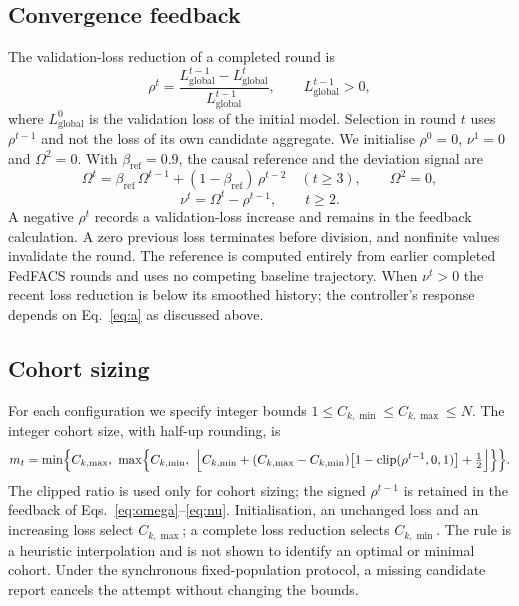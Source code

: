 \documentclass[pdflatex,sn-basic]{sn-jnl}
\begin{document}
\subsection{Convergence feedback}\label{sec4.5}
The validation-loss reduction of a completed round is
\begin{equation}\label{eq:rho}
\rho^t=\frac{L_{\mathrm{global}}^{t-1}-L_{\mathrm{global}}^{t}}{L_{\mathrm{global}}^{t-1}},\qquad L_{\mathrm{global}}^{t-1}>0,
\end{equation}
where $L_{\mathrm{global}}^0$ is the validation loss of the initial model. Selection in round $t$ uses $\rho^{t-1}$ and not the loss of its own candidate aggregate. We initialise $\rho^0=0$, $\nu^1=0$ and $\Omega^2=0$. With $\beta_{\mathrm{ref}}=0.9$, the causal reference and the deviation signal are
\begin{equation}\label{eq:omega}
\Omega^t=\beta_{\mathrm{ref}}\,\Omega^{t-1}+(1-\beta_{\mathrm{ref}})\,\rho^{t-2}\quad(t\ge 3),\qquad \Omega^2=0,
\end{equation}
\begin{equation}\label{eq:nu}
\nu^t=\Omega^t-\rho^{t-1},\qquad t\ge 2 .
\end{equation}
A negative $\rho^t$ records a validation-loss increase and remains in the feedback calculation. A zero previous loss terminates before division, and nonfinite values invalidate the round. The reference is computed entirely from earlier completed FedFACS rounds and uses no competing baseline trajectory. When $\nu^t>0$ the recent loss reduction is below its smoothed history; the controller's response depends on Eq.~\eqref{eq:a} as discussed above.

\subsection{Cohort sizing}\label{sec4.6}
For each configuration we specify integer bounds $1\le C_{k,\min}\le C_{k,\max}\le N$. The integer cohort size, with half-up rounding, is
\begin{equation}\label{eq:cohort}
m_t=\min\Bigl\{C_{k,\max},\ \max\Bigl\{C_{k,\min},\ \Bigl\lfloor C_{k,\min}+(C_{k,\max}-C_{k,\min})\bigl[1-\operatorname{clip}(\rho^{t-1},0,1)\bigr]+\tfrac12\Bigr\rfloor\Bigr\}\Bigr\}.
\end{equation}
The clipped ratio is used only for cohort sizing; the signed $\rho^{t-1}$ is retained in the feedback of Eqs.~\eqref{eq:omega}--\eqref{eq:nu}. Initialisation, an unchanged loss and an increasing loss select $C_{k,\max}$; a complete loss reduction selects $C_{k,\min}$. The rule is a heuristic interpolation and is not shown to identify an optimal or minimal cohort. Under the synchronous fixed-population protocol, a missing candidate report cancels the attempt without changing the bounds.
\end{document}
